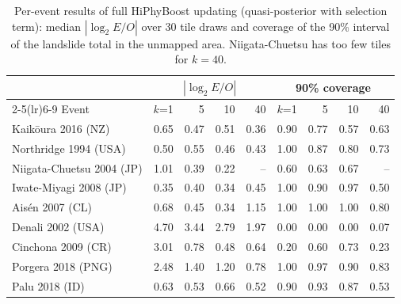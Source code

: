 \begin{table}[ht]\centering\small
\caption{Per-event results of full HiPhyBoost updating (quasi-posterior with selection term): median $|\log_2 E/O|$ over 30 tile draws and coverage of the 90\% interval of the landslide total in the unmapped area. Niigata-Chuetsu has too few tiles for $k=40$.}\label{tab:perevent}
\begin{tabular}{lrrrrrrrr}\toprule
 & \multicolumn{4}{c}{$|\log_2 E/O|$} & \multicolumn{4}{c}{90\% coverage}\\\cmidrule(lr){2-5}\cmidrule(lr){6-9}
Event & $k$=1 & 5 & 10 & 40 & $k$=1 & 5 & 10 & 40\\\midrule
Kaik\={o}ura 2016 (NZ) & 0.65 & 0.47 & 0.51 & 0.36 & 0.90 & 0.77 & 0.57 & 0.63\\
Northridge 1994 (USA) & 0.50 & 0.55 & 0.46 & 0.43 & 1.00 & 0.87 & 0.80 & 0.73\\
Niigata-Chuetsu 2004 (JP) & 1.01 & 0.39 & 0.22 & -- & 0.60 & 0.63 & 0.67 & --\\
Iwate-Miyagi 2008 (JP) & 0.35 & 0.40 & 0.34 & 0.45 & 1.00 & 0.90 & 0.97 & 0.50\\
Ais\'{e}n 2007 (CL) & 0.68 & 0.45 & 0.34 & 1.15 & 1.00 & 1.00 & 1.00 & 0.80\\
Denali 2002 (USA) & 4.70 & 3.44 & 2.79 & 1.97 & 0.00 & 0.00 & 0.00 & 0.07\\
Cinchona 2009 (CR) & 3.01 & 0.78 & 0.48 & 0.64 & 0.20 & 0.60 & 0.73 & 0.23\\
Porgera 2018 (PNG) & 2.48 & 1.40 & 1.20 & 0.78 & 1.00 & 0.97 & 0.90 & 0.83\\
Palu 2018 (ID) & 0.63 & 0.53 & 0.66 & 0.52 & 0.90 & 0.93 & 0.87 & 0.53\\
\bottomrule\end{tabular}\end{table}
